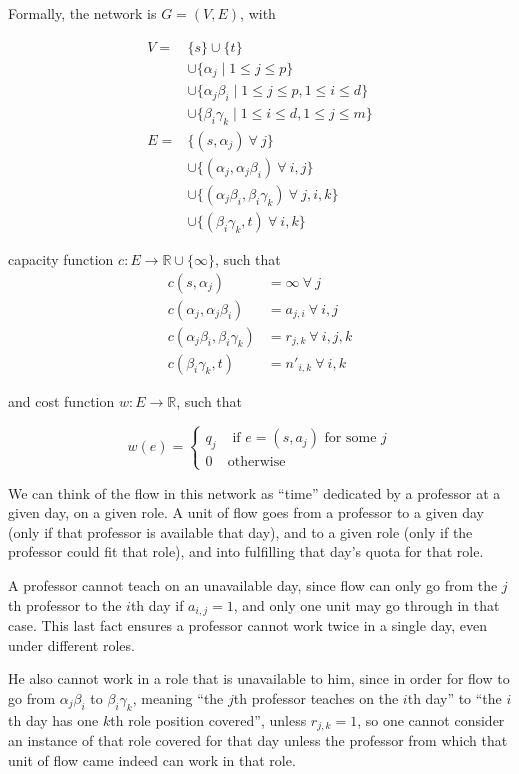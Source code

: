 Formally, the network is $G = (V, E)$, with

\begin{align*}
V = &\{s\} \cup \{t\}\\
&\cup \{\alpha_j \mid 1 \le j \le p\}\\
&\cup \{\alpha_j \beta_i \mid 1 \le j \le p, 1 \le i \le d\}\\
&\cup \{\beta_i \gamma_k \mid 1 \le i \le d, 1 \le j \le m\}\\
E = &\{(s, \alpha_j)\ \forall\ j\}\\
    &\cup \{(\alpha_j, \alpha_j \beta_i)\ \forall\ i, j \}\\
    &\cup \{(\alpha_j \beta_i, \beta_i \gamma_k)\ \forall\ j, i, k\}\\
    &\cup \{(\beta_i \gamma_k, t)\ \forall\ i, k \}
\end{align*}

capacity function $c:E \to \mathbb{R} \cup \{\infty\}$, such that
\begin{align*}
c(s, \alpha_j) &= \infty\ \forall\ j\\
c(\alpha_j, \alpha_j \beta_i) &= a_{j, i}\ \forall\ i, j\\
c(\alpha_j \beta_i, \beta_i \gamma_k) &= r_{j, k}\ \forall\ i, j, k\\
c(\beta_i \gamma_k, t) &= n'_{i, k}\ \forall\ i, k
\end{align*}

and cost function $w:E \to \mathbb{R}$, such that

$$
w(e) =
\begin{cases}
q_j &\text{ if } e = (s, a_j) \text{ for some }j\\
0 & \text{otherwise}
\end{cases}
$$

We can think of the flow in this network as ``time'' dedicated by a professor at a given day, on a given role. A unit of flow goes from a professor to a given day (only if that professor is available that day), and to a given role (only if the professor could fit that role), and into fulfilling that day's quota for that role.

A professor cannot teach on an unavailable day, since flow can only go from the $j$th professor to the $i$th day if $a_{i, j} = 1$, and only one unit may go through in that case. This last fact ensures a professor cannot work twice in a single day, even under different roles.

He also cannot work in a role that is unavailable to him, since in order for flow to go from $\alpha_j \beta_i$ to $\beta_i \gamma_k$, meaning ``the $j$th professor teaches on the $i$th day'' to ``the $i$th day has one $k$th role position covered'', unless $r_{j, k} = 1$, so one cannot consider an instance of that role covered for that day unless the professor from which that unit of flow came indeed can work in that role.

